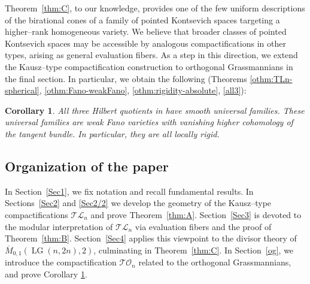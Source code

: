 \documentclass[10pt]{amsart}
\theoremstyle{definition}
\newcommand{\LG}{\operatorname{LG}}
\DeclareMathOperator{\Sp}{Sp}
\newcommand{\TL}{\mathcal{TL}}
\newcommand{\TO}{\mathcal{TO}}
\theoremstyle{plain} %
\newtheorem{corollaryABC}[theoremABC]{Corollary}
\begin{document}
Theorem~\ref{thm:C}, to our knowledge, provides one of the few uniform descriptions of the birational cones of a family of pointed Kontsevich spaces targeting a higher--rank homogeneous variety. %
We believe that broader classes of pointed Kontsevich spaces may be accessible by analogous compactifications in other types, arising as general evaluation fibers. As a step in this direction,
we extend the Kausz--type compactification construction to orthogonal Grassmannians in the final section. In particular, we obtain the following (Theorems  \ref{othm:TLn-spherical},   \ref{othm:Fano-weakFano}, \ref{othm:rigidity-absolute},  \ref{all3}):
\begin{corollaryABC}\label{thm:D}
All three Hilbert quotients in \cite{Th1} have smooth universal families.  These universal families are weak Fano varieties with vanishing higher cohomology of the tangent bundle. In particular, they are all locally rigid.
\end{corollaryABC}


\subsection*{Organization of the paper}
In Section~\ref{Sec1}, we fix notation and recall fundamental results.
In Sections~\ref{Sec2} and \ref{Sec2/2} we develop the geometry of the Kausz--type compactifications $\TL_n$ and prove Theorem~\ref{thm:A}.
Section~\ref{Sec3} is devoted to the modular interpretation of $\TL_n$ via evaluation fibers and the proof of Theorem~\ref{thm:B}.
Section~\ref{Sec4} applies this viewpoint to the divisor theory of $\overline{M}_{0,1}(\LG(n,2n),2)$, culminating in Theorem~\ref{thm:C}. In Section~\ref{og}, we introduce the compactification $\TO_n$ related to the orthogonal Grassmannians, and prove Corollary \ref{thm:D}.
\end{document}
